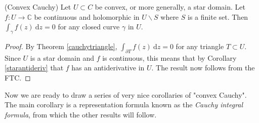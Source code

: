 \documentclass[egregdoesnotlikesansseriftitles,a4paper]{scrartcl}
\begin{document}
\begin{corollary}(Convex Cauchy)\label{convexcauchy}
      Let $U \subset C$ be convex, or more generally, a star domain. Let $f: U \rightarrow \mathbb{C}$ be continuous and holomorphic in $U \backslash S$ where $S$ is a finite set. Then $\int_{\gamma}^{}f (z) \ \mathrm{d}z=0 $ for any closed curve $\gamma$ in $U$.
\end{corollary}
\begin{proof}
      By Theorem \ref{cauchytriangle}, $\int_{ \partial T}^{} f (z)\ \mathrm{d}z=0 $ for any triangle $T \subset U$. Since $U$ is a star domain and $f$ is continuous, this means that by Corollary \ref{starantideriv} that $f$ has an antiderivative in $U$. The result now follows from the FTC.
\end{proof}
Now we are ready to draw a series of very nice corollaries of "convex Cauchy". The main corollary is a representation formula known as the \emph{Cauchy integral formula}, from which the other results will follow.
\end{document}
